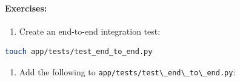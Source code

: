 \documentclass[
  screen,review,acmlarge]{acmart}
\newcommand{\passthrough}[1]{#1}
\providecommand{\tightlist}{%
  \setlength{\itemsep}{0pt}\setlength{\parskip}{0pt}}
\begin{document}
\paragraph{Exercises:}\label{exercises-7}

\begin{enumerate}
\def\labelenumi{\arabic{enumi}.}
\tightlist
\item
  Create an end-to-end integration test:
\end{enumerate}

\begin{lstlisting}[language=bash]
touch app/tests/test_end_to_end.py
\end{lstlisting}

\begin{enumerate}
\def\labelenumi{\arabic{enumi}.}
\setcounter{enumi}{1}
\tightlist
\item
  Add the following to \passthrough{\lstinline!app/tests/test\_end\_to\_end.py!}:
\end{enumerate}
\end{document}
